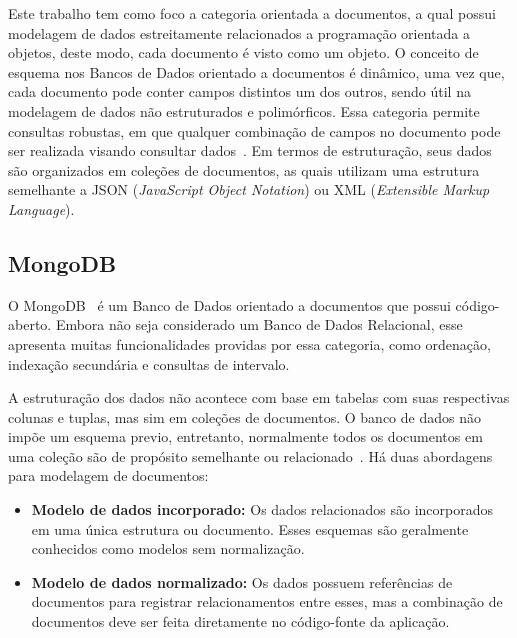 \documentclass[12pt]{article}
\begin{document}

Este trabalho tem como foco a categoria orientada a documentos, a qual possui modelagem de dados estreitamente relacionados a programação orientada a objetos, deste modo, cada documento é visto como um objeto. O conceito de esquema nos Bancos de Dados orientado a documentos é dinâmico, uma vez que, cada documento pode conter campos distintos um dos outros, sendo útil na modelagem de dados não estruturados e polimórficos. Essa categoria permite consultas robustas, em que qualquer combinação de campos no documento pode ser realizada visando consultar dados~\cite{patil:2017}. Em termos de estruturação, seus dados são organizados em coleções de documentos, as quais utilizam uma estrutura semelhante a JSON (\emph{JavaScript Object Notation}) ou XML (\emph{Extensible Markup Language}).

\subsection{MongoDB}

O MongoDB~\cite{membrey2011definitive} é um Banco de Dados orientado a documentos que possui código-aberto. Embora não seja considerado um Banco de Dados Relacional, esse apresenta muitas funcionalidades providas por essa categoria, como ordenação, indexação secundária e consultas de intervalo.

A estruturação dos dados não acontece com base em tabelas com suas respectivas colunas e tuplas, mas sim em coleções de documentos. O banco de dados não impõe um esquema previo, entretanto, normalmente todos os documentos em uma coleção são de propósito semelhante ou relacionado~\cite{kanade2014study,lutu2015big}. Há duas abordagens para modelagem de documentos:

\begin{itemize}
\item \textbf{Modelo de dados incorporado:} Os dados relacionados são incorporados em uma única estrutura ou documento. Esses esquemas são geralmente conhecidos como modelos sem normalização. %
\item \textbf{Modelo de dados normalizado:} Os dados possuem referências de documentos para registrar relacionamentos entre esses, mas a combinação de documentos deve ser feita diretamente no código-fonte da aplicação. %
\end{itemize}
\end{document}
